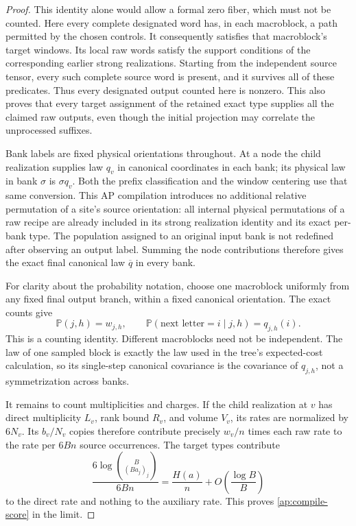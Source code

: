 \documentclass[11pt]{article}
\numberwithin{equation}{section}
\theoremstyle{definition}
\theoremstyle{remark}
\newcommand{\Prob}{\mathbb P}
\begin{document}
\begin{proof}
This identity alone would allow a formal zero fiber, which must not be
counted.  Here every complete designated word has, in each macroblock,
a path permitted by the chosen controls.  It consequently satisfies that
macroblock's target windows.  Its local raw words satisfy the support
conditions of the corresponding earlier strong realizations.  Starting from
the independent source tensor, every such complete source word is present,
and it survives all of these predicates.  Thus every designated output
counted here is nonzero.  This also proves that every target assignment
of the retained exact type supplies all the claimed raw outputs, even
though the initial projection may correlate the unprocessed suffixes.

Bank labels are fixed physical orientations throughout.  At a node the
child realization supplies law \(q_v\) in canonical coordinates in each
bank; its physical law in bank \(\sigma\) is \(\sigma q_v\).
Both the prefix classification and the window centering use that same
conversion.  This AP compilation introduces no additional relative
permutation of a site's source orientation: all internal physical
permutations of a raw recipe are already included in its strong realization
identity and its exact per-bank type.  The population assigned to an
original input bank is not redefined after observing an output label.
Summing the node contributions therefore gives the exact final canonical
law \(\overline q\) in every bank.

For clarity about the probability notation, choose one macroblock uniformly
from any fixed final output branch, within a fixed canonical orientation.
The exact counts give
\[
 \Prob(j,h)=w_{j,h},
 \qquad
 \Prob(\text{next letter}=i\mid j,h)=q_{j,h}(i).
\]
This is a counting identity.  Different macroblocks need not be independent.
The law of one sampled block is exactly the law used in the tree's
expected-cost calculation, so its single-step canonical covariance is
the covariance of \(q_{j,h}\), not a symmetrization across banks.

It remains to count multiplicities and charges.  If the child realization
at \(v\) has direct multiplicity \(L_v\), rank bound \(R_v\), and
volume \(V_v\), its rates are normalized by \(6N_v\).  Its
\(b_v/N_v\) copies therefore contribute precisely \(w_v/n\) times
each raw rate to the rate per \(6Bn\) source occurrences.  The target
types contribute
\[
 \frac{6\log\binom B{(Ba_j)_j}}{6Bn}
  =\frac{H(a)}n+O\left(\frac{\log B}{B}\right)
\]
to the direct rate and nothing to the auxiliary rate.  This proves
\eqref{ap:compile-score} in the limit.


\end{proof}
\end{document}
